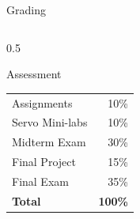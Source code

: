 \begin{frame}{Grading}
    
    \begin{columns}
        \begin{column}{0.5\textwidth}
            \begin{block}{Assessment}
                \centering
                \begin{tabular}{lr}
                    Assignments      & 10\% \\
                    Servo Mini-labs     & 10\% \\
                    \alert{Midterm Exam}  & \alert{30\%} \\
                    Final Project & 15\% \\
                    \alert{Final Exam} & \alert{35\%} \\
                    \midrule
                    \textbf{Total} & \textbf{100\%} \\
                \end{tabular}
            \end{block}
        \end{column}
    \end{columns}
    
\end{frame}